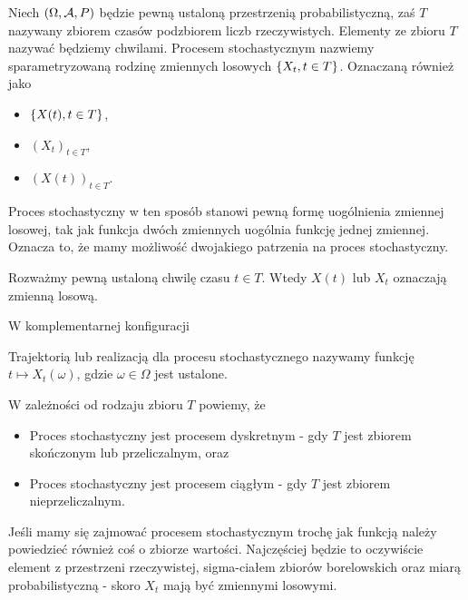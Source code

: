 \documentclass[10pt,a4paper]{book}
\begin{document}
\begin{definition}
Niech $(\Omega, \mathcal{A}, P)$ będzie pewną ustaloną przestrzenią probabilistyczną, zaś $T$ nazywany zbiorem czasów podzbiorem liczb rzeczywistych. Elementy ze zbioru $T$ nazywać będziemy chwilami. 
Procesem stochastycznym nazwiemy sparametryzowaną rodzinę zmiennych losowych $\left\lbrace {{X_t}, {t \in T}} \right\rbrace$. Oznaczaną również jako 
\begin{itemize}
\item $\left\lbrace {X(t), t \in T} \right\rbrace$,
\item $(X_t)_{t \in T}$,
\item $(X(t))_{t \in T}$.
\end{itemize}
\end{definition}

Proces stochastyczny w ten sposób stanowi pewną formę uogólnienia zmiennej losowej, tak jak funkcja dwóch zmiennych uogólnia funkcję jednej zmiennej.
Oznacza to, że mamy możliwość dwojakiego patrzenia na proces stochastyczny.

\begin{remark*}
Rozważmy pewną ustaloną chwilę czasu $t \in T$. Wtedy $X(t)$ lub $X_t$ oznaczają zmienną losową. 
\end{remark*}

W komplementarnej konfiguracji

\begin{definition}
Trajektorią lub realizacją dla procesu stochastycznego nazywamy funkcję $t \mapsto X_t(\omega)$, gdzie $\omega \in \Omega$ jest ustalone.
\end{definition}

\begin{definition}
W zależności od rodzaju zbioru $T$ powiemy, że
\begin{itemize}
\item Proces stochastyczny jest procesem dyskretnym - gdy $T$ jest zbiorem skończonym lub przeliczalnym, oraz
\item Proces stochastyczny jest procesem ciągłym - gdy $T$ jest zbiorem nieprzeliczalnym.
\end{itemize}
\end{definition}

Jeśli mamy się zajmować procesem stochastycznym trochę jak funkcją należy powiedzieć również coś o zbiorze wartości. Najczęściej będzie to oczywiście element z przestrzeni rzeczywistej, sigma-ciałem zbiorów borelowskich oraz miarą probabilistyczną - skoro $X_t$ mają być zmiennymi losowymi.
\end{document}
